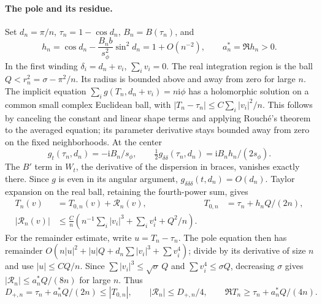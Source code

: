 \documentclass[11pt]{article}
\numberwithin{equation}{section}
\theoremstyle{definition}
\newcommand{\ii}{\mathrm i}
\begin{document}
\paragraph{The pole and its residue.}
Set $d_n=\pi/n$, $\tau_n=1-\cos d_n$, $B_n=B(\tau_n)$, and
\[
 h_n=\cos d_n-\frac{B_nb}{s_\phi^2}\sin^2d_n=1+O(n^{-2}),
 \qquad a_n^*=\Re h_n>0.
\]
In the first winding $\delta_i=d_n+v_i$, $\sum_i v_i=0$.
The real integration region is the ball $Q<r_n^2=\sigma-\pi^2/n$.
Its radius is bounded above and away from zero for large $n$.
The implicit equation $\sum_i g(T_n,d_n+v_i)=n\ii\phi$ has a
holomorphic solution on a common small complex Euclidean ball,
with $|T_n-\tau_n|\le C\sum_i|v_i|^2/n$.
This follows by canceling the constant and linear shape terms and
applying Rouch\'e's theorem to the averaged equation; its parameter
derivative stays bounded away from zero on the fixed neighborhoods.
At the center
\[
 g_t(\tau_n,d_n)=-\ii B_n/s_\phi,\qquad
 \tfrac12g_{\delta\delta}(\tau_n,d_n)
                         =\ii B_nh_n/(2s_\phi).
\]
The $B'$ term in $W_t$, the derivative of the dispersion in braces,
vanishes exactly there.
Since $g$ is even in its angular argument,
$g_{\delta\delta\delta}(t,d_n)=O(d_n)$.  Taylor expansion on the
real ball, retaining the fourth-power sum, gives
\begin{align}
 T_n(v)&=T_{0,n}(v)+\mathcal R_n(v),
 &T_{0,n}&=\tau_n+h_nQ/(2n),\nonumber\\
 |\mathcal R_n(v)|&\le\frac Cn
 \left(n^{-1}\sum_i|v_i|^3+\sum_i v_i^4+Q^2/n\right).
                                                        \label{neg:new:realerror}
\end{align}
For the remainder estimate, write $u=T_n-\tau_n$.  The pole equation
then has remainder $O(n|u|^2+|u|Q+d_n\sum|v_i|^3+\sum v_i^4)$;
divide by its derivative of size $n$ and use
$|u|\le CQ/n$. Since $\sum|v_i|^3\le\sqrt{\sigma}\,Q$ and
$\sum v_i^4\le\sigma Q$, decreasing $\sigma$ gives
$|\mathcal R_n|\le a_n^*Q/(8n)$ for large $n$. Thus
\[
 D_{+,n}=\tau_n+a_n^*Q/(2n)\le|T_{0,n}|,\qquad
 |\mathcal R_n|\le D_{+,n}/4,\qquad
 \Re T_n\ge\tau_n+a_n^*Q/(4n).
\]
\end{document}
